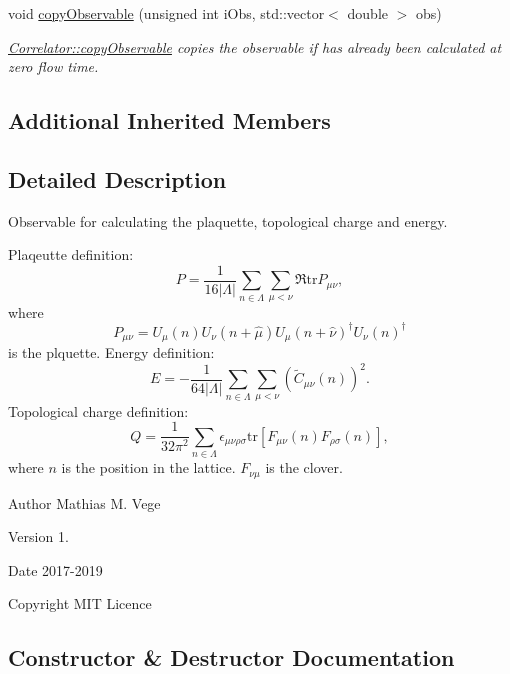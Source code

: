 \begin{DoxyCompactItemize}
void \mbox{\hyperlink{class_master_sampler_a893be9ba7dca98cb8d9d3cb30e42fcc3}{copy\+Observable}} (unsigned int i\+Obs, std\+::vector$<$ double $>$ obs)
\begin{DoxyCompactList}\small\item\em \mbox{\hyperlink{class_correlator_ac780d8b180294ee4801ede6e6a13f7f4}{Correlator\+::copy\+Observable}} copies the observable if has already been calculated at zero flow time. \end{DoxyCompactList}\end{DoxyCompactItemize}
\subsection*{Additional Inherited Members}


\subsection{Detailed Description}
Observable for calculating the plaquette, topological charge and energy. 

Plaqeutte definition\+: \[ P = \frac{1}{16|\Lambda|} \sum_{n\in\Lambda} \sum_{\mu < \nu} \Re \mathrm{tr} P_{\mu\nu}, \] where \[ P_{\mu\nu}=U_\mu(n) U_{\nu}(n+\hat{\mu}) U_{\mu}(n+\hat{\nu})^\dagger U_{\nu} (n)^\dagger \] is the plquette. Energy definition\+: \[ E = -\frac{1}{64|\Lambda|} \sum_{n\in\Lambda} \sum_{\mu<\nu} \left(\tilde{C}_{\mu\nu}(n)\right)^2. \] Topological charge definition\+: \[ Q = \frac{1}{32\pi^2} \sum_{n\in\Lambda} \epsilon_{\mu\nu\rho\sigma} \mathrm{tr}\left[F_{\mu\nu}(n)F_{\rho\sigma}(n)\right], \] where $n$ is the position in the lattice. $F_{\nu\mu}$ is the clover.

\begin{DoxyAuthor}{Author}
Mathias M. Vege 
\end{DoxyAuthor}
\begin{DoxyVersion}{Version}
1. 
\end{DoxyVersion}
\begin{DoxyDate}{Date}
2017-\/2019 
\end{DoxyDate}
\begin{DoxyCopyright}{Copyright}
M\+IT Licence 
\end{DoxyCopyright}


\subsection{Constructor \& Destructor Documentation}
\mbox{\label{class_master_sampler_ac5ee503e8391aca36f73872a45bb6bd9}} 

